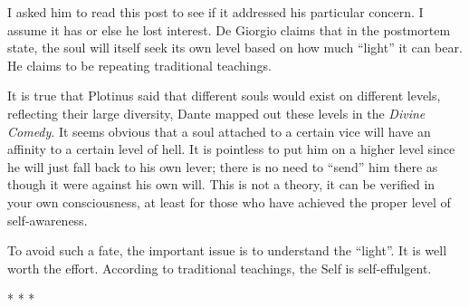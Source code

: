 I asked him to read this post to see if it addressed his particular concern. I assume it has or else he lost interest. De Giorgio claims that in the postmortem state, the soul will itself seek its own level based on how much ``light'' it can bear. He claims to be repeating traditional teachings.

It is true that Plotinus said that different souls would exist on different levels, reflecting their large diversity, Dante mapped out these levels in the \emph{Divine Comedy}. It seems obvious that a soul attached to a certain vice will have an affinity to a certain level of hell. It is pointless to put him on a higher level since he will just fall back to his own lever; there is no need to ``send'' him there as though it were against his own will. This is not a theory, it can be verified in your own consciousness, at least for those who have achieved the proper level of self-awareness.

To avoid such a fate, the important issue is to understand the ``light''. It is well worth the effort. According to traditional teachings, the Self is self-effulgent.



\begin{center}* * *\end{center}

